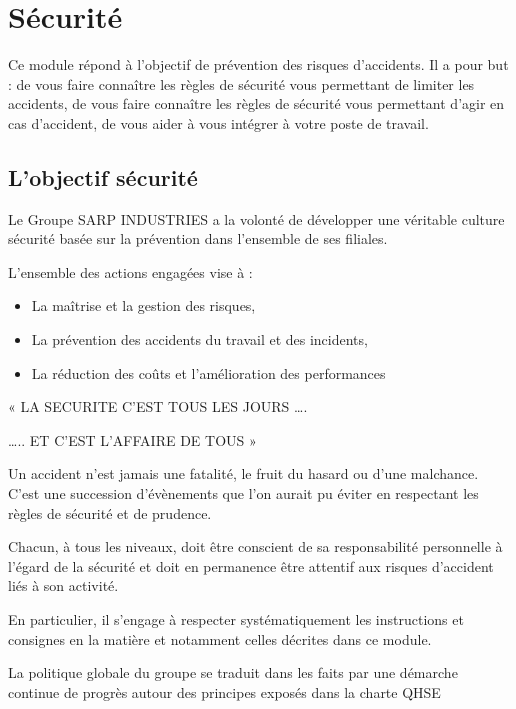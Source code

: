 \chapter{Sécurité}

Ce module répond à l’objectif de prévention des risques d’accidents. 
Il a pour but :
de vous faire connaître les règles de sécurité vous permettant de limiter les accidents,
de vous faire connaître les règles de sécurité vous permettant d’agir en cas d’accident,
de vous aider à vous intégrer à votre poste de travail.



\section{L’objectif sécurité}

Le Groupe SARP INDUSTRIES a la volonté de développer une véritable culture sécurité basée sur la prévention dans l’ensemble de ses filiales.

L’ensemble des actions engagées vise à :

\begin{itemize}
    \item La maîtrise et la gestion des risques,
    \item La prévention des accidents du travail et des incidents,
    \item La réduction des coûts et l’amélioration des performances
\end{itemize}




« LA SECURITE C’EST TOUS LES JOURS ….

   ….. ET C’EST L’AFFAIRE DE TOUS »



Un accident n’est jamais une fatalité, le fruit du hasard ou d’une malchance. C’est une succession d’évènements que l’on aurait pu éviter en respectant les règles de sécurité et de prudence. 


Chacun, à tous les niveaux, doit être conscient de sa responsabilité personnelle à l’égard de la sécurité et doit en permanence être attentif aux risques d’accident liés à son activité. 


En particulier, il s’engage à respecter systématiquement les instructions et consignes en la matière et notamment celles décrites dans ce module.


La politique globale du groupe se traduit dans les faits par une démarche continue de progrès autour des principes exposés dans la charte QHSE

